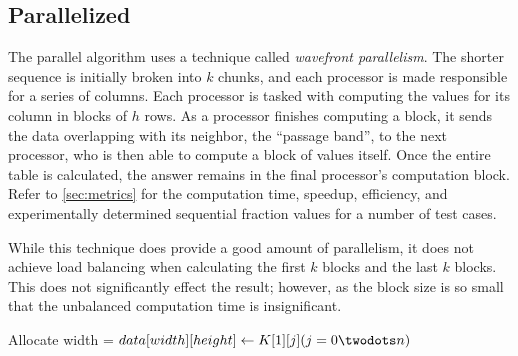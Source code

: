 \subsection{Parallelized}
The parallel algorithm uses a technique called \textit{wavefront
  parallelism}. The shorter sequence is initially broken into $ k $
chunks, and each processor is made responsible for a series of
columns. Each processor is tasked with computing the values for its
column in blocks of $h$ rows. As a processor finishes computing a
block, it sends the data overlapping with its neighbor, the ``passage
band'', to the next processor, who is then able to compute a block of
values itself. Once the entire table is calculated, the answer remains
in the final processor's computation block. Refer to \ref{sec:metrics}
for the computation time, speedup, efficiency, and experimentally
determined sequential fraction values for a number of test cases.

While this technique does provide a good amount of parallelism, it
does not achieve load balancing when calculating the first $ k $
blocks and the last $ k $ blocks. This does not significantly effect
the result; however, as the block size is so small that the unbalanced
computation time is insignificant.

\begin{codebox}
\li	\Comment Allocate
\li width = 
\li $data[width][height] \gets K[1][j] (j=0\twodots n)$
\end{codebox}



